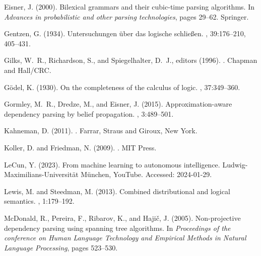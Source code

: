 \documentclass[11pt]{article}
\begin{document}
\begin{thebibliography}{}
    Eisner, J. (2000).
    \newblock Bilexical grammars and their cubic-time parsing algorithms.
    \newblock In {\em Advances in probabilistic and other parsing technologies},
      pages 29--62. Springer.
    
    Gentzen, G. (1934).
    \newblock Untersuchungen {\"u}ber das logische schlie{\ss}en.
    , 39:176--210, 405--431.
    
    Gilks, W.~R., Richardson, S., and Spiegelhalter, D.~J., editors (1996).
    .
    \newblock Chapman and Hall/CRC.
    
    G{\"o}del, K. (1930).
    \newblock On the completeness of the calculus of logic.
    , 37:349--360.
    
    Gormley, M.~R., Dredze, M., and Eisner, J. (2015).
    \newblock Approximation-aware dependency parsing by belief propagation.
    ,
      3:489--501.
    
    Kahneman, D. (2011).
    .
    \newblock Farrar, Straus and Giroux, New York.
    
    Koller, D. and Friedman, N. (2009).
    .
    \newblock MIT Press.
    
    LeCun, Y. (2023).
    \newblock From machine learning to autonomous intelligence.
    \newblock Ludwig-Maximilians-Universität München, YouTube.
    \newblock Accessed: 2024-01-29.
    
    Lewis, M. and Steedman, M. (2013).
    \newblock Combined distributional and logical semantics.
    ,
      1:179--192.
    
    McDonald, R., Pereira, F., Ribarov, K., and Haji{\v{c}}, J. (2005).
    \newblock Non-projective dependency parsing using spanning tree algorithms.
    \newblock In {\em Proceedings of the conference on Human Language Technology
      and Empirical Methods in Natural Language Processing}, pages 523--530.
    

\end{thebibliography}
\end{document}
